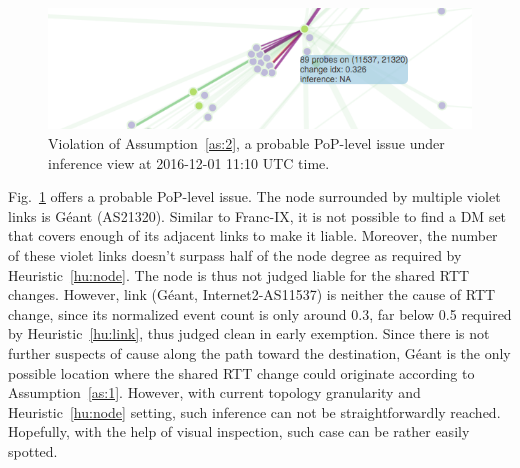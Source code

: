 \begin{figure}[!htb]
\centering
\includegraphics[width=.8\textwidth]{gfx/chap5/case_pop_issue.png}
\caption{Violation of Assumption~\ref{as:2}, a probable PoP-level issue under inference view at 2016-12-01 11:10 UTC time.}
\label{fig:case_pop_issue}
\end{figure}

Fig.~\ref{fig:case_pop_issue} offers a probable PoP-level issue. The node surrounded by multiple violet links is 
Géant (AS21320). 
Similar to Franc-IX, it is not possible to find a \ac{DM} set that covers enough of its adjacent links to make it liable. Moreover, the number of these violet links doesn't surpass half of the node degree as required by Heuristic~\ref{hu:node}. The node is thus not judged liable for the shared RTT changes. 
However, link (Géant, Internet2-AS11537) is neither the cause of RTT change, since its normalized event count is only around 0.3, far below 0.5 required by Heuristic~\ref{hu:link}, thus judged clean in early exemption.
Since there is not further suspects of cause along the path toward the destination, Géant is the only possible location where the shared RTT change could originate according to Assumption~\ref{as:1}. However, with current  topology granularity and Heuristic~\ref{hu:node} setting, such inference can not be straightforwardly reached.
Hopefully, with the help of visual inspection, such case can be rather easily spotted.